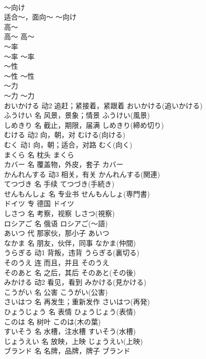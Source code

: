 \documentclass[8pt]{extreport}
\begin{document}
\begin{CJK}{UTF8}{min}
\\	～向け	
\\	适合～，面向～	～向け	
\\	高～	
\\	高～	高～	
\\	～率	
\\	～率	～率	
\\	～性	
\\	～性	～性	
\\	～力	
\\	～力	～力	
\\	おいかける	动2	追赶；紧接着，紧跟着	おいかける(追いかける)	
\\	ふうけい	名	风景，景象；情景	ふうけい(風景)	
\\	しめきり	名	截止，期限，届满	しめきり(締め切り)	
\\	むける	动2	向，朝，对	むける(向ける)	
\\	むく	动1	向，朝；适合，对路	むく(向く)	
\\	まくら	名	枕头	まくら	
\\	カバー	名	覆盖物，外皮，套子	カバー	
\\	かんれんする	动3	相关，有关	かんれんする(関連)	
\\	てつづき	名	手续	てつづき(手続き)	
\\	せんもんしょ	名	专业书	せんもんしょ(専門書)	
\\	ドイツ	专	德国	ドイツ	
\\	しさつ	名	考察，视察	しさつ(視察)	
\\	ロシアご	名	俄语	ロシアご(～語)	
\\	あいつ	代	那家伙，那小子	あいつ	
\\	なかま	名	朋友，伙伴，同事	なかま(仲間)	
\\	うらぎる	动1	背叛，违背	うらぎる(裏切る)	
\\	そのうえ	连	而且，并且	そのうえ	
\\	そのあと	名	之后，其后	そのあと(その後)	
\\	みかける	动2	看见，看到	みかける(見かける)	
\\	こうがい	名	公害	こうがい(公害)	
\\	さいはつ	名	再发生；重新发作	さいはつ(再発)	
\\	ひょうじょう	名	表情	ひょうじょう(表情)	
\\	このは	名	树叶	このは(木の葉)	
\\	すいそう	名	水槽，注水槽	すいそう(水槽)	
\\	じょうえい	名	放映，上映	じょうえい(上映)	
\\	ブランド	名	名牌，品牌，牌子	ブランド	

\end{CJK}
\end{document}
